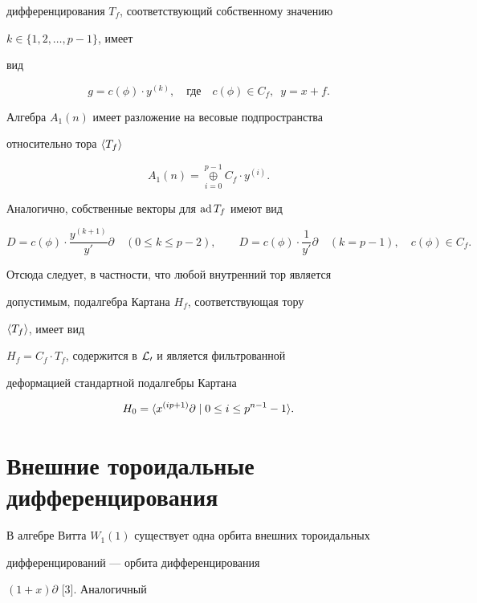 дифференцирования $T_f$, соответствующий собственному значению


$k\in\{1,2,\dotsc,p-1\}$, имеет


вид


$$


g=c(\phi)\cdot y^{(k)},\quad \text{где} \quad


c(\phi)\in C_f,\ \;y=x+f.


$$


Алгебра $A_1(n)$ имеет разложение на весовые подпространства


относительно тора $\langle T_f\rangle$


$$


A_1(n)=\overset{p-1}{\underset{i=0}{\oplus}}{}C_f\cdot y^{(i)}.


$$


Аналогично, собственные векторы для $\operatorname{ad} T_f$ имеют вид


$$


D=c(\phi)\cdot\frac{y^{(k+1)}}{y'}\partial \quad (0\le k\le p-2),


\qquad D=c(\phi)\cdot\frac{1}{y'}\partial \quad


(k=p-1), \quad c(\phi)\in C_f.


$$


Отсюда следует, в частности, что любой внутренний тор является


допустимым, подалгебра Картана $H_f$, соответствующая тору


$\langle T_f\rangle$, имеет вид


$H_f=C_f\cdot T_f$, содержится в $\cal L_0$ и является фильтрованной


деформацией стандартной подалгебры Картана


$$


H_0=\la x^{(ip+1)}\partial\mid 0\le i\le p^{n-1}-1\ra.


$$





\section{Внешние тороидальные дифференцирования}





В алгебре Витта $W_1(1)$ существует одна орбита внешних тороидальных


дифференцирований --- орбита дифференцирования


$(1+x)\partial$ [3]. Аналогичный


